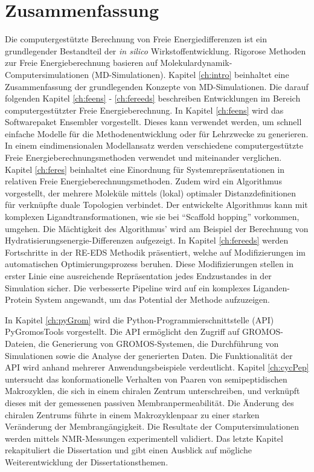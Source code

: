 \chapter{Zusammenfassung}
Die computergestützte Berechnung von Freie Energiedifferenzen ist ein grundlegender Bestandteil der \textit{in silico} Wirkstoffentwicklung. Rigorose Methoden zur Freie Energieberechnung basieren auf Molekulardynamik-Computersimulationen (MD-Simulationen). Kapitel \ref{ch:intro} beinhaltet eine Zusammenfassung der grundlegenden Konzepte von MD-Simulationen. 
Die darauf folgenden Kapitel \ref{ch:feens} - \ref{ch:fereeds} beschreiben Entwicklungen im Bereich computergestützter Freie Energieberechnung. 
In Kapitel \ref{ch:feens} wird das Softwarepaket Ensembler vorgestellt. Dieses kann verwendet werden, um schnell einfache Modelle für die Methodenentwicklung oder für Lehrzwecke zu generieren. In einem eindimensionalen Modellansatz werden verschiedene computergestützte Freie Energieberechnungsmethoden verwendet und miteinander verglichen. 
Kapitel \ref{ch:feres} beinhaltet eine Einordnung für Systemrepräsentationen in relativen Freie Energieberechnungsmethoden. Zudem wird ein Algorithmus vorgestellt, der mehrere Moleküle mittels (lokal) optimaler Distanzdefinitionen für verknüpfte duale Topologien verbindet. Der entwickelte Algorithmus kann mit komplexen Ligandtransformationen, wie sie bei ``Scaffold hopping'' vorkommen, umgehen. Die Mächtigkeit des Algorithmus' wird am Beispiel der Berechnung von Hydratisierungsenergie-Differenzen aufgezeigt.
In Kapitel \ref{ch:fereeds} werden Fortschritte in der RE-EDS Methodik präsentiert, welche auf Modifizierungen im automatischen Optimierungsprozess beruhen. Diese Modifizierungen stellen in erster Linie eine ausreichende Repräsentation jedes Endzustandes in der Simulation sicher. Die verbesserte Pipeline wird auf ein komplexes Liganden-Protein System angewandt, um das Potential der Methode aufzuzeigen.

In Kapitel \ref{ch:pyGrom} wird die Python-Programmierschnittstelle (API) PyGromosTools vorgestellt. Die API ermöglicht den Zugriff auf GROMOS-Dateien, die Generierung von GROMOS-Systemen, die Durchführung von Simulationen sowie die Analyse der generierten Daten. Die Funktionalität der API wird anhand mehrerer Anwendungsbeispiele verdeutlicht.
Kapitel \ref{ch:cycPep} untersucht das konformationelle Verhalten von Paaren von semipeptidischen Makrozyklen, die sich in einem chiralen Zentrum unterschreiben, und verknüpft dieses mit der gemessenen passiven Membranpermeabilität. Die Änderung des chiralen Zentrums führte in einem Makrozyklenpaar zu einer starken  Ver{\"a}nderung der Membrangängigkeit. Die Resultate der Computersimulationen werden mittels NMR-Messungen experimentell validiert.
Das letzte Kapitel rekapituliert die Dissertation und gibt einen Ausblick auf  mögliche Weiterentwicklung der Dissertationsthemen.


